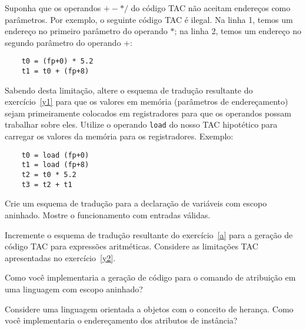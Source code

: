 \documentclass{compiladores}
\begin{document}
\begin{listanumerada}
\item \label{y2} Suponha que os operandos $+ - * /$ do código TAC não aceitam
  endereços como parâmetros. Por exemplo, o seguinte código TAC é
  ilegal. Na linha 1, temos um endereço no primeiro parâmetro do
  operando $*$; na linha 2, temos um endereço no segundo parâmetro do
  operando $+$:
  \begin{lstlisting}
    t0 = (fp+0) * 5.2
    t1 = t0 + (fp+8)
  \end{lstlisting}
  Sabendo desta limitação, altere o esquema de tradução resultante do
  exercício~\ref{y1} para que os valores em memória (parâmetros de
  endereçamento) sejam primeiramente colocados em registradores para
  que os operandos possam trabalhar sobre eles. Utilize o operando
  \texttt{load} do nosso TAC hipotético para carregar os valores da
  memória para os registradores. Exemplo:
  \begin{lstlisting}
    t0 = load (fp+0)
    t1 = load (fp+8)
    t2 = t0 * 5.2
    t3 = t2 + t1
  \end{lstlisting}

\item \label{a} Crie um esquema de tradução para a declaração de variáveis com
  escopo aninhado. Mostre o funcionamento com entradas
  válidas.

\item Incremente o esquema de tradução resultante do exercício~\ref{a}
  para a geração de código TAC para expressões aritméticas. Considere
  as limitações TAC apresentadas no exercício~\ref{y2}.

\item Como você implementaria a geração de código para o comando de
  atribuição em uma linguagem com escopo aninhado?

\item Considere uma linguagem orientada a objetos com o conceito de
  herança. Como você implementaria o endereçamento dos atributos de
  instância?
\end{listanumerada}
\end{document}
